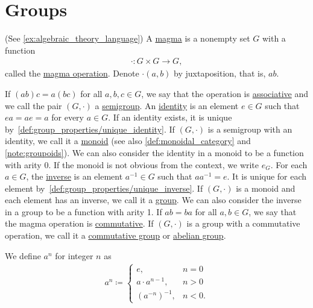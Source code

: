 \section{Groups}\label{sec:groups}

\begin{definition}\label{def:group}(See \cref{ex:algebraic_theory_language})
  A \ul{magma} is a nonempty set $G$ with a function 
  \begin{align*}
    \cdot: G \times G \to G,
  \end{align*}
  called the \ul{magma operation}. Denote $\cdot(a, b)$ by juxtaposition, that is, $ab$.

  \begin{description}
     If $(ab)c = a(bc)$ for all $a, b, c \in G$, we say that the operation is \ul{associative} and we call the pair $(G, \cdot)$ a \ul{semigroup}.
     An \ul{identity} is an element $e \in G$ such that $ea = ae = a$ for every $a \in G$. If an identity exists, it is unique by~\cref{def:group_properties/unique_identity}. If $(G, \cdot)$ is a semigroup with an identity, we call it a \ul{monoid} (see also \cref{def:monoidal_category} and \cref{note:groupoids}). We can also consider the identity in a monoid to be a function with arity 0. If the monoid is not obvious from the context, we write $e_G$.
     For each $a \in G$, the \ul{inverse} is an element $a^{-1} \in G$ such that $aa^{-1} = e$. It is unique for each element by~\cref{def:group_properties/unique_inverse}. If $(G, \cdot)$ is a monoid and each element has an inverse, we call it a \ul{group}. We can also consider the inverse in a group to be a function with arity 1.
     If $ab = ba$ for all $a, b \in G$, we say that the magma operation is \ul{commutative}. If $(G, \cdot)$ is a group with a commutative operation, we call it a \ul{commutative group} or \ul{abelian group}.
  \end{description}

  We define $a^n$ for integer $n$ as
  \begin{align*}
    a^n \coloneqq \begin{cases}
      e, &n = 0 \\
      a \cdot a^{n-1}, &n > 0 \\
      (a^{-n})^{-1}, &n < 0.
    \end{cases}
  \end{align*}


\end{definition}
